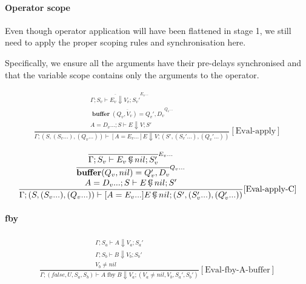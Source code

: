 \documentclass{scrartcl}
\DeclareMathOperator{\fby}{fby}
\DeclareMathOperator{\ceval}{\overset{C}{\smash{\Downarrow}}}
\DeclareMathOperator{\buffer}{\mathbf{buffer}}
\begin{document}
    \paragraph{Operator scope}
    
    Even though operator application will have been flattened in stage 1, we still need to apply the proper scoping rules and synchronisation here.
    
    Specifically, we ensure all the arguments have their pre-delays synchronised and that the variable scope contains only the arguments to the operator.
    
    \begin{align*}
    \frac{
        \begin{matrix}
        \overline{\Gamma; S_v \vdash E_v \Downarrow V_v; S_v'}^{E_v...} \\
        \overline{\buffer(Q_v, V_v) = Q_v', D_v}^{Q_v...} \\
        A = D_v...; S \vdash E \Downarrow V; S'
        \end{matrix}
    }{
        \Gamma; (S, (S_v...), (Q_v...)) \vdash [A=E_v...]E \Downarrow V; (S', (S_v'...), (Q_v'...))
    }[\text{Eval-apply}]
    \end{align*}
    
    \begin{align*}
    \frac{
        \begin{matrix}
        \overline{\Gamma; S_v \vdash E_v \ceval nil; S_v'}^{E_v...} \\
        \overline{\buffer(Q_v, nil) = Q_v', D_v}^{Q_v...} \\
        A = D_v...; S \vdash E \ceval nil; S'
        \end{matrix}
    }{
        \Gamma; (S, (S_v...), (Q_v...)) \vdash [A=E_v...]E \ceval nil; (S', (S_v'...), (Q_v'...))
    }[\text{Eval-apply-C}]
    \end{align*}
    
    \paragraph{fby}
    
    \begin{align*}
    \frac{
        \begin{matrix}
        \Gamma; S_a \vdash A \Downarrow V_a; S_a' \\
        \Gamma; S_b \vdash B \Downarrow V_b; S_b' \\
        V_b \neq nil
        \end{matrix}
    }{
        \Gamma; (false, U, S_a, S_b) \vdash A \fby B \Downarrow V_a; (V_a \neq nil, V_b, S_a', S_b')
    }[\text{Eval-fby-A-buffer}]
    \end{align*}
    
\end{document}
